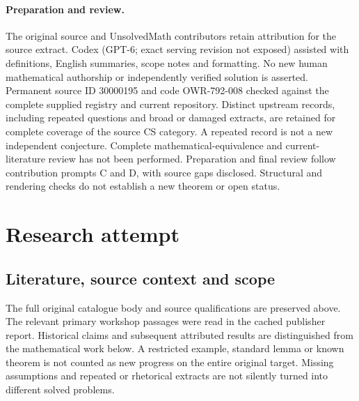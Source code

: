 \documentclass[11pt]{article}
\begin{document}
\paragraph{Preparation and review.}
The original source and UnsolvedMath contributors retain attribution for the source extract. Codex (GPT-6; exact serving revision not exposed) assisted with definitions, English summaries, scope notes and formatting. No new human mathematical authorship or independently verified solution is asserted. Permanent source ID 30000195 and code OWR-792-008 checked against the complete supplied registry and current repository. Distinct upstream records, including repeated questions and broad or damaged extracts, are retained for complete coverage of the source CS category. A repeated record is not a new independent conjecture. Complete mathematical-equivalence and current-literature review has not been performed. Preparation and final review follow contribution prompts C and D, with source gaps disclosed. Structural and rendering checks do not establish a new theorem or open status.
\label{end:30000195}

\section{Research attempt}
\subsection{Literature, source context and scope}
The full original catalogue body and source qualifications are preserved above. The relevant primary workshop passages were read in the cached publisher report. Historical claims and subsequent attributed results are distinguished from the mathematical work below. A restricted example, standard lemma or known theorem is not counted as new progress on the entire original target. Missing assumptions and repeated or rhetorical extracts are not silently turned into different solved problems.
\end{document}

